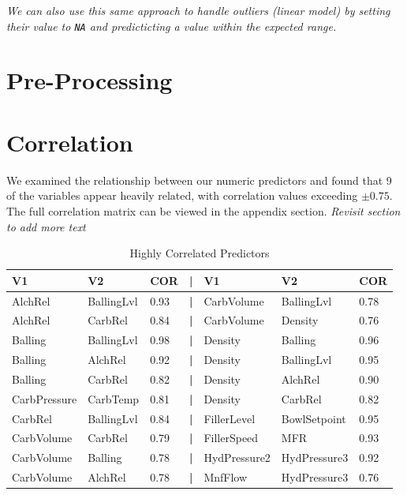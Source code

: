 \documentclass[]{report}
\begin{document}
\emph{We can also use this same approach to handle outliers (linear
model) by setting their value to \texttt{NA} and predicticting a value
within the expected range.}

\hypertarget{pre-processing}{%
\section{Pre-Processing}\label{pre-processing}}

\hypertarget{correlation}{%
\section{Correlation}\label{correlation}}

We examined the relationship between our numeric predictors and found
that 9 of the variables appear heavily related, with correlation values
exceeding \(\pm{0.75}\). The full correlation matrix can be viewed in
the appendix section. \emph{Revisit section to add more text}

\begin{table}[H]

\caption{\label{tab:unnamed-chunk-6}Highly Correlated Predictors}
\fontsize{8}{10}\selectfont
\begin{tabular}{lll>{\bfseries}llll}
\toprule
\textbf{V1} & \textbf{V2} & \textbf{COR} & \textbf{|} & \textbf{V1  } & \textbf{V2 } & \textbf{COR }\\
\midrule
\rowcolor{gray!6}  AlchRel & BallingLvl & 0.93 & | & CarbVolume & BallingLvl & 0.78\\
AlchRel & CarbRel & 0.84 & | & CarbVolume & Density & 0.76\\
\rowcolor{gray!6}  Balling & BallingLvl & 0.98 & | & Density & Balling & 0.96\\
Balling & AlchRel & 0.92 & | & Density & BallingLvl & 0.95\\
\rowcolor{gray!6}  Balling & CarbRel & 0.82 & | & Density & AlchRel & 0.90\\
\addlinespace
CarbPressure & CarbTemp & 0.81 & | & Density & CarbRel & 0.82\\
\rowcolor{gray!6}  CarbRel & BallingLvl & 0.84 & | & FillerLevel & BowlSetpoint & 0.95\\
CarbVolume & CarbRel & 0.79 & | & FillerSpeed & MFR & 0.93\\
\rowcolor{gray!6}  CarbVolume & Balling & 0.78 & | & HydPressure2 & HydPressure3 & 0.92\\
CarbVolume & AlchRel & 0.78 & | & MnfFlow & HydPressure3 & 0.76\\
\bottomrule
\end{tabular}
\end{table}
\end{document}
